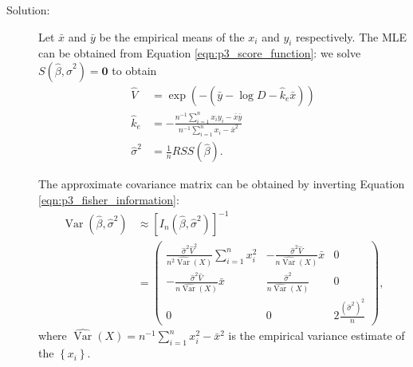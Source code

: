 \documentclass[letterpaper,11pt]{article}
\begin{document}
\begin{enumerate}
\begin{enumerate}
    \begin{description}
    \item[Solution:] Let $\bar{x}$ and $\bar{y}$ be the empirical means of the
      $x_i$ and $y_i$ respectively. The MLE can be obtained from Equation
      \ref{eqn:p3_score_function}: we solve
      $S\left(\hat{\beta}, \hat{\sigma}^2\right) = \mathbf{0}$ to obtain
      \begin{align}
        \hat{V}
        &= \exp\left(
          -\left(\bar{y} - \log D - \hat{k}_e\bar{x}\right)
          \right) \nonumber\\
        \hat{k}_e
        &= -\frac{n^{-1}\sum_{i=1}^nx_iy_i - \bar{x}\bar{y}}{n^{-1}\sum_{i=1}^nx_i - \bar{x}^2}
        \nonumber\\
        \hat{\sigma}^2
        &= \frac{1}{n}RSS\left(\hat{\beta}\right).
          \label{eqn:p3_mles}
      \end{align}

      The approximate covariance matrix can be obtained by inverting Equation
      \ref{eqn:p3_fisher_information}:
      \begin{align}
        \operatorname{Var}\left(\hat{\beta}, \hat{\sigma}^2\right)
        &\approx
          \left[I_n\left(\hat{\beta}, \hat{\sigma}^2\right)\right]^{-1}
          \label{eqn:p3_variances}\\
        &= \begin{pmatrix}
          \frac{\hat{\sigma}^2\hat{V}^2}{n^2\hat{\operatorname{Var}}\left(X\right)}\sum_{i=1}^nx_i^2 &
          -\frac{\hat{\sigma}^2\hat{V}}{n\hat{\operatorname{Var}}\left(X\right)}\bar{x} & 0 \\
          -\frac{\hat{\sigma}^2\hat{V}}{n\hat{\operatorname{Var}}\left(X\right)}\bar{x} &
            \frac{\hat{\sigma}^2}{n\hat{\operatorname{Var}}\left(X\right)} & 0 \\
          0 & 0 & 2\frac{\left(\hat{\sigma}^2\right)^2}{n}
        \end{pmatrix}, \nonumber                  
      \end{align}
      where
      $\hat{\operatorname{Var}}\left(X\right) = n^{-1}\sum_{i=1}^nx_i^2 -
      \bar{x}^2$ is the empirical variance estimate of the $\left\{x_i\right\}$.


\end{description}
\end{enumerate}
\end{enumerate}
\end{document}

